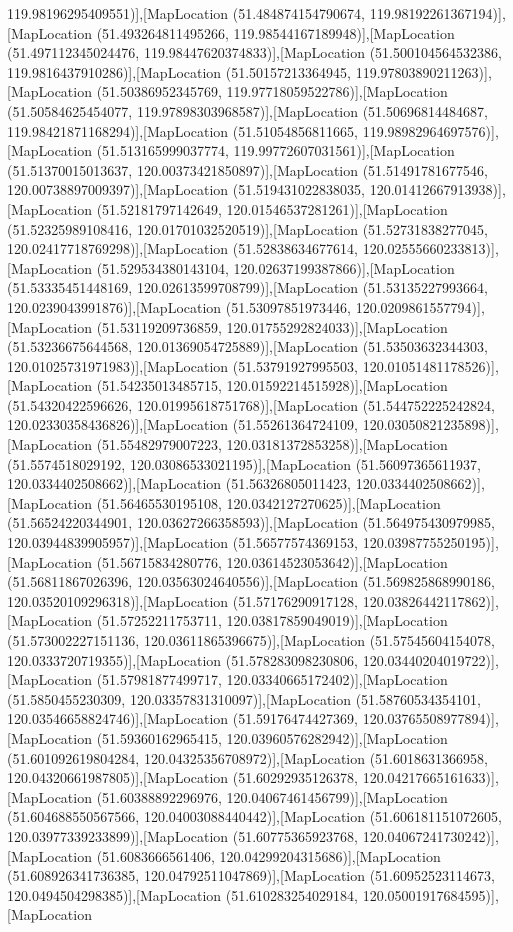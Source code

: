 119.98196295409551)],[MapLocation (51.484874154790674, 119.98192261367194)],[MapLocation (51.493264811495266, 119.98544167189948)],[MapLocation (51.497112345024476, 119.98447620374833)],[MapLocation (51.500104564532386, 119.9816437910286)],[MapLocation (51.50157213364945, 119.97803890211263)],[MapLocation (51.50386952345769, 119.97718059522786)],[MapLocation (51.50584625454077, 119.97898303968587)],[MapLocation (51.50696814484687, 119.98421871168294)],[MapLocation (51.51054856811665, 119.98982964697576)],[MapLocation (51.513165999037774, 119.99772607031561)],[MapLocation (51.51370015013637, 120.00373421850897)],[MapLocation (51.51491781677546, 120.00738897009397)],[MapLocation (51.519431022838035, 120.01412667913938)],[MapLocation (51.52181797142649, 120.01546537281261)],[MapLocation (51.52325989108416, 120.01701032520519)],[MapLocation (51.52731838277045, 120.02417718769298)],[MapLocation (51.52838634677614, 120.02555660233813)],[MapLocation (51.529534380143104, 120.02637199387866)],[MapLocation (51.53335451448169, 120.02613599708799)],[MapLocation (51.53135227993664, 120.0239043991876)],[MapLocation (51.53097851973446, 120.0209861557794)],[MapLocation (51.53119209736859, 120.01755292824033)],[MapLocation (51.53236675644568, 120.01369054725889)],[MapLocation (51.53503632344303, 120.01025731971983)],[MapLocation (51.53791927995503, 120.01051481178526)],[MapLocation (51.54235013485715, 120.01592214515928)],[MapLocation (51.54320422596626, 120.01995618751768)],[MapLocation (51.544752225242824, 120.02330358436826)],[MapLocation (51.55261364724109, 120.03050821235898)],[MapLocation (51.55482979007223, 120.03181372853258)],[MapLocation (51.5574518029192, 120.03086533021195)],[MapLocation (51.56097365611937, 120.0334402508662)],[MapLocation (51.56326805011423, 120.0334402508662)],[MapLocation (51.56465530195108, 120.0342127270625)],[MapLocation (51.56524220344901, 120.03627266358593)],[MapLocation (51.564975430979985, 120.03944839905957)],[MapLocation (51.56577574369153, 120.03987755250195)],[MapLocation (51.56715834280776, 120.03614523053642)],[MapLocation (51.56811867026396, 120.03563024640556)],[MapLocation (51.569825868990186, 120.03520109296318)],[MapLocation (51.57176290917128, 120.03826442117862)],[MapLocation (51.57252211753711, 120.03817859049019)],[MapLocation (51.573002227151136, 120.03611865396675)],[MapLocation (51.57545604154078, 120.0333720719355)],[MapLocation (51.578283098230806, 120.03440204019722)],[MapLocation (51.57981877499717, 120.03340665172402)],[MapLocation (51.5850455230309, 120.03357831310097)],[MapLocation (51.58760534354101, 120.03546658824746)],[MapLocation (51.59176474427369, 120.03765508977894)],[MapLocation (51.59360162965415, 120.03960576282942)],[MapLocation (51.601092619804284, 120.04325356708972)],[MapLocation (51.6018631366958, 120.04320661987805)],[MapLocation (51.60292935126378, 120.04217665161633)],[MapLocation (51.60388892296976, 120.04067461456799)],[MapLocation (51.604688550567566, 120.04003088440442)],[MapLocation (51.606181151072605, 120.03977339233899)],[MapLocation (51.60775365923768, 120.04067241730242)],[MapLocation (51.6083666561406, 120.04299204315686)],[MapLocation (51.608926341736385, 120.04792511047869)],[MapLocation (51.60952523114673, 120.0494504298385)],[MapLocation (51.610283254029184, 120.05001917684595)],[MapLocation 